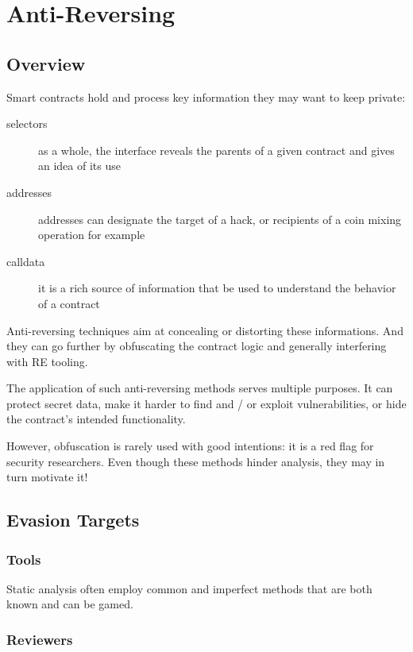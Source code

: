 \section{Anti-Reversing} \label{sec:anti-reversing}

\subsection{Overview}

Smart contracts hold and process key information they may want to keep private:

\begin{description}
\item[selectors]{as a whole, the interface reveals the parents of a given contract and gives an idea of its use}
\item[addresses]{addresses can designate the target of a hack, or recipients of a coin mixing operation for example}
\item[calldata]{it is a rich source of information that be used to understand the behavior of a contract}
\end{description}

Anti-reversing techniques aim at concealing or distorting these informations.
And they can go further by obfuscating the contract logic and generally interfering with RE tooling.

The application of such anti-reversing methods serves multiple purposes.
It can protect secret data, make it harder to find and / or exploit vulnerabilities, or hide the contract's intended functionality.

However, obfuscation is rarely used with good intentions: it is a red flag for security researchers.
Even though these methods hinder analysis, they may in turn motivate it!

\subsection{Evasion Targets}

\subsubsection{Tools}

Static analysis often employ common and imperfect methods that are both known and can be gamed.

\subsubsection{Reviewers}

